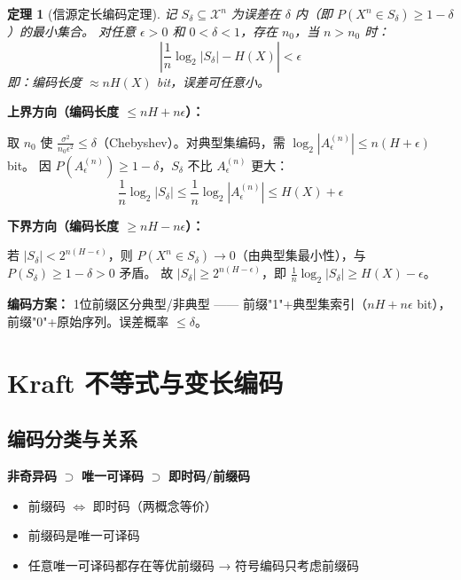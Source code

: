 \documentclass[12pt,a4paper]{ctexart}
\newtheorem{theorem}{定理}[section]
\theoremstyle{definition}
\newcommand{\XX}{\mathcal{X}}
\begin{document}
\begin{theorem}[信源定长编码定理]
记 $S_\delta \subseteq \XX^n$ 为误差在 $\delta$ 内（即 $P(X^n \in S_\delta) \geq 1-\delta$）的最小集合。
对任意 $\epsilon > 0$ 和 $0 < \delta < 1$，存在 $n_0$，当 $n > n_0$ 时：
\[
\left|\frac{1}{n}\log_2 |S_\delta| - H(X)\right| < \epsilon
\]
即：编码长度 $\approx nH(X)$ bit，误差可任意小。
\end{theorem}

\begin{proofbox}[证明思路]
\textbf{上界方向（编码长度 $\leq nH + n\epsilon$）：}

取 $n_0$ 使 $\frac{\sigma^2}{n_0\epsilon^2} \leq \delta$（Chebyshev）。对典型集编码，需 $\log_2|A_\epsilon^{(n)}| \leq n(H+\epsilon)$ bit。
因 $P(A_\epsilon^{(n)}) \geq 1-\delta$，$S_\delta$ 不比 $A_\epsilon^{(n)}$ 更大：
\[
\frac{1}{n}\log_2|S_\delta| \leq \frac{1}{n}\log_2|A_\epsilon^{(n)}| \leq H(X) + \epsilon
\]

\textbf{下界方向（编码长度 $\geq nH - n\epsilon$）：}

若 $|S_\delta| < 2^{n(H-\epsilon)}$，则 $P(X^n \in S_\delta) \to 0$（由典型集最小性），与 $P(S_\delta) \geq 1-\delta > 0$ 矛盾。
故 $|S_\delta| \geq 2^{n(H-\epsilon)}$，即 $\frac{1}{n}\log_2|S_\delta| \geq H(X) - \epsilon$。

\textbf{编码方案：} 1位前缀区分典型/非典型 —— 前缀"1"+典型集索引（$nH+n\epsilon$ bit），前缀"0"+原始序列。误差概率 $\leq \delta$。
\end{proofbox}

\section{Kraft 不等式与变长编码}

\subsection{编码分类与关系}

\begin{center}
\textbf{非奇异码} $\supset$ \textbf{唯一可译码} $\supset$ \textbf{即时码/前缀码}
\end{center}

\begin{itemize}[nosep]
  \item 前缀码 $\Leftrightarrow$ 即时码（两概念等价）
  \item 前缀码是唯一可译码
  \item 任意唯一可译码都存在等优前缀码 → 符号编码只考虑前缀码
\end{itemize}
\end{document}
